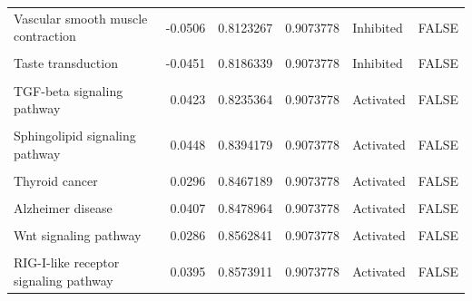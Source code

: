 \documentclass[9pt,a4paper,]{extarticle}
\begin{document}
\begin{table}
{\begin{tabular}[t]{lrrrll}
Vascular smooth muscle contraction & -0.0506 & 0.8123267 & 0.9073778 & Inhibited & FALSE\\
\cellcolor{gray!6}{Insulin secretion} & \cellcolor{gray!6}{-0.0434} & \cellcolor{gray!6}{0.8141222} & \cellcolor{gray!6}{0.9073778} & \cellcolor{gray!6}{Inhibited} & \cellcolor{gray!6}{FALSE}\\
Taste transduction & -0.0451 & 0.8186339 & 0.9073778 & Inhibited & FALSE\\
\addlinespace
\cellcolor{gray!6}{Carbohydrate digestion and absorption} & \cellcolor{gray!6}{-0.0451} & \cellcolor{gray!6}{0.8186339} & \cellcolor{gray!6}{0.9073778} & \cellcolor{gray!6}{Inhibited} & \cellcolor{gray!6}{FALSE}\\
TGF-beta signaling pathway & 0.0423 & 0.8235364 & 0.9073778 & Activated & FALSE\\
\cellcolor{gray!6}{Cholinergic synapse} & \cellcolor{gray!6}{-0.0516} & \cellcolor{gray!6}{0.8393188} & \cellcolor{gray!6}{0.9073778} & \cellcolor{gray!6}{Inhibited} & \cellcolor{gray!6}{FALSE}\\
Sphingolipid signaling pathway & 0.0448 & 0.8394179 & 0.9073778 & Activated & FALSE\\
\cellcolor{gray!6}{Small cell lung cancer} & \cellcolor{gray!6}{-0.0411} & \cellcolor{gray!6}{0.8453160} & \cellcolor{gray!6}{0.9073778} & \cellcolor{gray!6}{Inhibited} & \cellcolor{gray!6}{FALSE}\\
\addlinespace
Thyroid cancer & 0.0296 & 0.8467189 & 0.9073778 & Activated & FALSE\\
\cellcolor{gray!6}{African trypanosomiasis} & \cellcolor{gray!6}{0.0375} & \cellcolor{gray!6}{0.8470451} & \cellcolor{gray!6}{0.9073778} & \cellcolor{gray!6}{Activated} & \cellcolor{gray!6}{FALSE}\\
Alzheimer disease & 0.0407 & 0.8478964 & 0.9073778 & Activated & FALSE\\
\cellcolor{gray!6}{Notch signaling pathway} & \cellcolor{gray!6}{-0.0335} & \cellcolor{gray!6}{0.8490255} & \cellcolor{gray!6}{0.9073778} & \cellcolor{gray!6}{Inhibited} & \cellcolor{gray!6}{FALSE}\\
Wnt signaling pathway & 0.0286 & 0.8562841 & 0.9073778 & Activated & FALSE\\
\addlinespace
\cellcolor{gray!6}{Graft-versus-host disease} & \cellcolor{gray!6}{-0.0428} & \cellcolor{gray!6}{0.8573038} & \cellcolor{gray!6}{0.9073778} & \cellcolor{gray!6}{Inhibited} & \cellcolor{gray!6}{FALSE}\\
RIG-I-like receptor signaling pathway & 0.0395 & 0.8573911 & 0.9073778 & Activated & FALSE\\

\end{tabular}}
\end{table}
\end{document}
